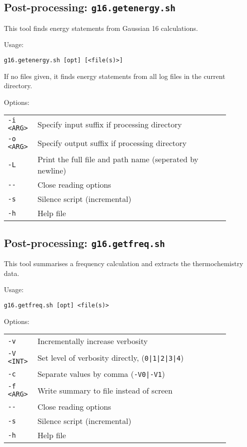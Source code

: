\documentclass[   %
  final,          %
  a4paper         %
]{article}
\begin{document}
\subsection{Post-processing: \texorpdfstring{{\lstinline`g16.getenergy.sh`}}{g16.getenergy.sh}}

This tool finds energy statements from Gaussian 16 calculations.

Usage: 

\lstinline`g16.getenergy.sh [opt] [<file(s)>]`

If no files given, it finds energy statements from all log files in the current directory.

Options: 

\begin{tabular}{p{0.1\linewidth}p{0.8\linewidth}}
  {\lstinline`-i <ARG>`} & Specify input suffix if processing directory \\
  {\lstinline`-o <ARG>`} & Specify output suffix if processing directory \\
  {\lstinline`-L`}       & Print the full file and path name (seperated by newline) \\
  {\lstinline`--`}       & Close reading options \\
  {\lstinline`-s`}       & Silence script (incremental) \\
  {\lstinline`-h`}       & Help file  \\
\end{tabular}

\subsection{Post-processing: \texorpdfstring{{\lstinline`g16.getfreq.sh`}}{g16.getfreq.sh}}

This tool summarises a frequency calculation and extracts the thermochemistry data.

Usage: 

\lstinline`g16.getfreq.sh [opt] <file(s)>`

Options:

\begin{tabular}{p{0.1\linewidth}p{0.8\linewidth}}
  {\lstinline`-v`}       & Incrementally increase verbosity \\
  {\lstinline`-V <INT>`} & Set level of verbosity directly, ({\lstinline`0|1|2|3|4`}) \\
  {\lstinline`-c`}       & Separate values by comma ({\lstinline`-V0|-V1`}) \\
  {\lstinline`-f <ARG>`} & Write summary to file instead of screen \\
  {\lstinline`--`}       & Close reading options \\
  {\lstinline`-s`}       & Silence script (incremental) \\
  {\lstinline`-h`}       & Help file  \\
\end{tabular}
\end{document}

